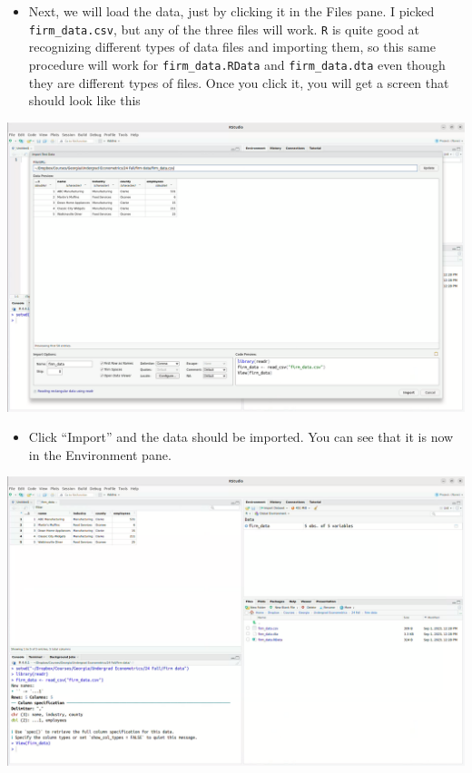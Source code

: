 \documentclass[
  letterpaper,
  DIV=11,
  numbers=noendperiod]{scrreprt}
\providecommand{\tightlist}{%
  \setlength{\itemsep}{0pt}\setlength{\parskip}{0pt}}\usepackage{longtable,booktabs,array}
\begin{document}
\begin{itemize}
\tightlist
\item
  Next, we will load the data, just by clicking it in the Files pane. I
  picked \texttt{firm\_data.csv}, but any of the three files will work.
  \texttt{R} is quite good at recognizing different types of data files
  and importing them, so this same procedure will work for
  \texttt{firm\_data.RData} and \texttt{firm\_data.dta} even though they
  are different types of files. Once you click it, you will get a screen
  that should look like this
\end{itemize}

\includegraphics{import_data.png}

\begin{itemize}
\tightlist
\item
  Click ``Import'' and the data should be imported. You can see that it
  is now in the Environment pane.
\end{itemize}

\includegraphics{import_data2.png}
\end{document}

